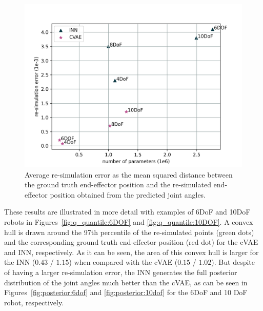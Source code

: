 \documentclass[conference]{IEEEtran}
\begin{document}
\begin{figure}[ht]
\centering
	\includegraphics[width=\linewidth]{figures/comparison_e_resim_alternative.png}
    \caption{\label{fig:plot:resim} Average re-simulation error as the mean squared distance between the ground truth end-effector position and the re-simulated end-effector position obtained from the predicted joint angles.}
\end{figure}

These results are illustrated in more detail with examples of 6DoF and 10DoF robots in Figures~\ref{fig:q_quantile:6DOF} and \ref{fig:q_quantile:10DOF}. A convex hull is drawn around the 97th percentile of the re-simulated points (green dots) and the corresponding ground truth end-effector position (red dot) for the cVAE and INN, respectively.  As it can be seen, the area of this convex hull is larger for the INN ($0.43$ / $1.15$) when compared with the cVAE ($0.15$ / $1.02$). But despite of having a larger re-simulation error, the INN generates the full posterior distribution of the joint angles much better than the cVAE, as can be seen in Figures~\ref{fig:posterior:6dof} and \ref{fig:posterior:10dof} for the 6DoF and 10 DoF robot, respectively. 
\end{document}
